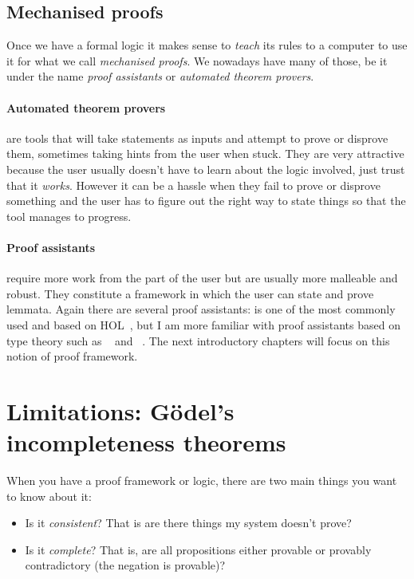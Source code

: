 \subsection{Mechanised proofs}

Once we have a formal logic it makes sense to \emph{teach} its rules to a
computer to use it for what we call \emph{mechanised proofs}.
We nowadays have many of those, be it under the name \emph{proof assistants} or
\emph{automated theorem provers}.

\paragraph{Automated theorem provers} are tools that will take statements as
inputs and attempt to prove or disprove them, sometimes taking hints from the
user when stuck.
They are very attractive because the user usually doesn't have to learn about
the logic involved, just trust that it \emph{works}. However it can be a hassle when they fail to prove or disprove
something and the user has to figure out the right way to state things so that
the tool manages to progress.

\paragraph{Proof assistants} require more work from the part of the user but are
usually more malleable and robust. They constitute a framework in which the user
can state and prove lemmata. Again there are several proof assistants: \IsaHOL
is one of the most commonly used and based on
\acrfull{HOL}~, but I am more  familiar with
proof assistants based on type theory such as \Coq~ and
\Agda~.
The next introductory chapters will focus on this notion of proof framework.

\section{Limitations: Gödel's incompleteness theorems}

When you have a proof framework or logic, there are two main things you want to
know about it:
\begin{itemize}
  \item Is it \emph{consistent}? That is are there things my system doesn't
  prove?
  \item Is it \emph{complete}? That is, are all propositions either provable
  or provably contradictory (\ie the negation is provable)?
\end{itemize}

